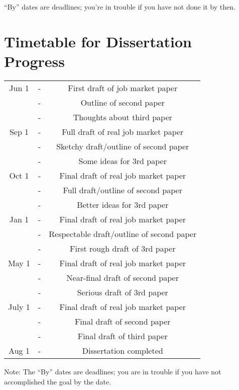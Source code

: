 \documentclass{\classes/econtex}
\begin{document}
``By'' dates are deadlines; you're in trouble if you have not done it by then.


\vfill\eject\pagebreak
\section*{\LARGE Timetable for Dissertation Progress}

\begin{center}
\begin{tabular}{|ccc|}\hline
     Jun 1 & - & First draft of job market paper
\\       & - & Outline of second paper
\\       & - & Thoughts about third paper
\\   Sep 1 & - & Full draft of real job market paper
\\     & - & Sketchy draft/outline of second paper
\\     & - & Some ideas for 3rd paper
\\ Oct 1 & - & Final draft of real job market paper
\\     & - & Full draft/outline of second paper
\\     & - & Better ideas for 3rd paper
\\ Jan 1 & - & Final draft of real job market paper
\\     & - & Respectable draft/outline of second paper
\\     & - & First rough draft of 3rd paper
\\ May 1 & - & Final draft of real job market paper
\\     & - & Near-final draft of second paper
\\     & - & Serious draft of 3rd paper
\\ July 1 & - & Final draft of real job market paper
\\     & - & Final draft of second paper
\\     & - & Final draft of third paper
\\ Aug 1 & - & Dissertation completed
\\ \hline 
\end{tabular}
\end{center}



Note: The ``By'' dates are deadlines; you are in trouble if you have not
accomplished the goal by the date.
\end{document}
